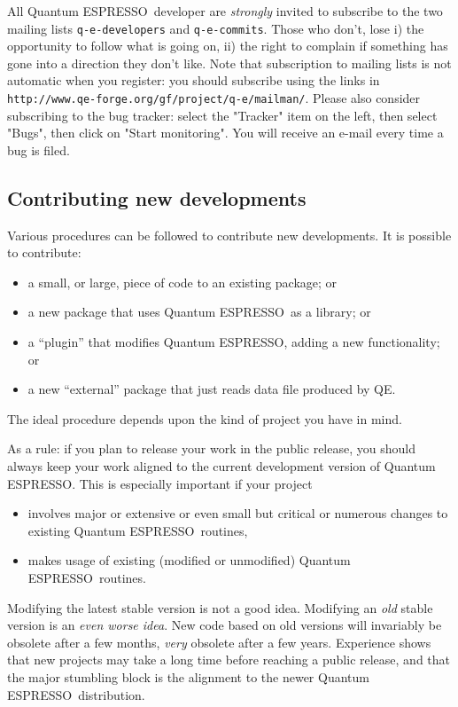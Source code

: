 \documentclass[12pt,a4paper]{article}
\def\qe{{\sc Quantum ESPRESSO}}
\begin{document}
All \qe\ developer are {\em strongly} invited to subscribe to the
two mailing lists \texttt{q-e-developers} and \texttt{q-e-commits}.
Those who don't, lose i) the opportunity to follow what is going on,
ii) the right to complain if something has gone into a direction
they don't like. Note that subscription to mailing lists is not
automatic when you register: you should subscribe using the links
in \texttt{http://www.qe-forge.org/gf/project/q-e/mailman/}.
Please also consider subscribing to the bug tracker: select the
"Tracker" item on the left, then select "Bugs", then click on
"Start monitoring". You will receive an e-mail every time a
bug is filed.

\subsection{Contributing new developments}
\label{SubSec:Contrib}

Various procedures can be followed to contribute new developments.
It is possible to contribute:
\begin{itemize}
\item a small, or large, piece of code to an existing package; or
\item a new package that uses \qe\ as a library; or
\item a ``plugin'' that modifies \qe, adding a new functionality; or
\item a new ``external'' package that just reads data file produced by QE.
\end{itemize}
The ideal procedure depends upon the kind of project you have in mind.

As a rule: if you plan to release your work in the public release, you
should always keep your work aligned to the current development version
of \qe. This is especially important if your project
\begin{itemize}
\item involves major or extensive or even small but critical or numerous
  changes to existing \qe\ routines,
\item makes usage of existing (modified or unmodified) \qe\ routines.
\end{itemize}
Modifying the latest stable version is not a good idea. Modifying
an {\em old} stable version is an {\em even worse idea}. New code
based on old versions will invariably be obsolete after a few months,
{\em very} obsolete after a few years. Experience shows that new projects
may take a long time before reaching a public release, and that the
major stumbling block is the alignment to the newer \qe\ distribution.
\end{document}
